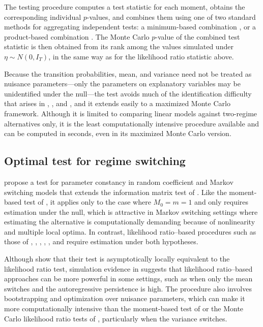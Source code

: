 The testing procedure computes a test statistic for each moment, obtains the corresponding individual \(p\)-values, and combines them using one of two standard methods for aggregating independent tests: a minimum-based combination \citep{tippett1931, wilkinson1951}, or a product-based combination \citep{fisher1932, pearson1933} \citep[see][ for further discussion]{dufour2004, dufour2014}. The Monte Carlo \(p\)-value of the combined test statistic is then obtained from its rank among the values simulated under \(\eta \sim N(0, I_T)\), in the same way as for the likelihood ratio statistic above.

Because the transition probabilities, mean, and variance need not be treated as nuisance parameters---only the parameters on explanatory variables may be unidentified under the null---the test avoids much of the identification difficulty that arises in \citet{hansen92}, \citet{garcia98}, and \citet{chp14}, and it extends easily to a maximized Monte Carlo framework. Although it is limited to comparing linear models against two-regime alternatives only, it is the least computationally intensive procedure available and can be computed in seconds, even in its maximized Monte Carlo version.

\subsection{Optimal test for regime switching}\label{optimal-test-for-regime-switching}

\citet{chp14} propose a test for parameter constancy in random coefficient and Markov switching models that extends the information matrix test of \citet{white1982}. Like the moment-based test of \citet{dufourluger17}, it applies only to the case where \(M_0 = m = 1\) and only requires estimation under the null, which is attractive in Markov switching settings where estimating the alternative is computationally demanding because of nonlinearity and multiple local optima. In contrast, likelihood ratio--based procedures such as those of \citet{hansen92}, \citet{garcia98}, \citet{chowhite07}, \citet{quzhuo2021likelihood}, \citet{kasshi2018}, and \citet{rodrondufour_mcmstest} require estimation under both hypotheses.

Although \citet{chp14} show that their test is asymptotically locally equivalent to the likelihood ratio test, simulation evidence in \citep{rodrondufour_mcmstest, quzhuo2021likelihood} suggests that likelihood ratio--based approaches can be more powerful in some settings, such as when only the mean switches and the autoregressive persistence is high. The procedure also involves bootstrapping and optimization over nuisance parameters, which can make it more computationally intensive than the moment-based test of \citet{dufourluger17} or the Monte Carlo likelihood ratio tests of \citet{rodrondufour_mcmstest}, particularly when the variance switches.

